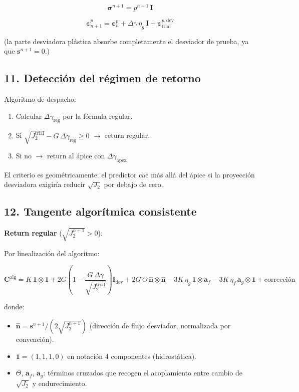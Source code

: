 \documentclass[11pt,letterpaper,oneside]{report}
\begin{document}
\[
\boldsymbol\sigma^{n+1} = p^{n+1}\,\mathbf I
\]

\[
\boldsymbol\varepsilon^p_{n+1} = \boldsymbol\varepsilon^p_n + \Delta\gamma\,\eta_g\,\mathbf I + \boldsymbol\varepsilon^{p,\text{dev}}_\text{trial}
\]

(la parte desviadora plástica absorbe completamente el desviador de prueba, ya que $\mathbf s^{n+1} = 0$.)

\subsection{11. Detección del régimen de retorno}

Algoritmo de despacho:

\begin{enumerate}
  \item Calcular $\Delta\gamma_\text{reg}$ por la fórmula regular.
  \item Si $\sqrt{J_2^\text{trial}} - G\,\Delta\gamma_\text{reg} \geq 0$ \ensuremath{\to} return regular.
  \item Si no \ensuremath{\to} return al ápice con $\Delta\gamma_\text{apex}$.
\end{enumerate}

El criterio es geométricamente: el predictor cae más allá del ápice si la proyección desviadora exigiría reducir $\sqrt{J_2}$ por debajo de cero.

\subsection{12. Tangente algorítmica consistente}

\textbf{Return regular} ($\sqrt{J_2^{n+1}} > 0$):

Por linealización del algoritmo:

\[
\mathbf C^\text{alg} = K\,\mathbf 1\otimes\mathbf 1 + 2G\left(1 - \frac{G\,\Delta\gamma}{\sqrt{J_2^\text{trial}}}\right)\mathbf I_\text{dev} + 2G\,\Theta\,\hat{\mathbf n}\otimes\hat{\mathbf n} - 3K\,\eta_g\,\mathbf 1\otimes \mathbf a_f - 3K\,\eta_f\,\mathbf a_g\otimes\mathbf 1 + \text{corrección}
\]

donde:
\begin{itemize}
  \item $\hat{\mathbf n} = \mathbf s^{n+1}/(2\sqrt{J_2^{n+1}})$ (dirección de flujo desviador, normalizada por convención).
  \item $\mathbf 1 = (1,1,1,0)$ en notación 4 componentes (hidrostática).
  \item $\Theta$, $\mathbf a_f$, $\mathbf a_g$: términos cruzados que recogen el acoplamiento entre cambio de $\sqrt{J_2}$ y endurecimiento.
\end{itemize}
\end{document}
